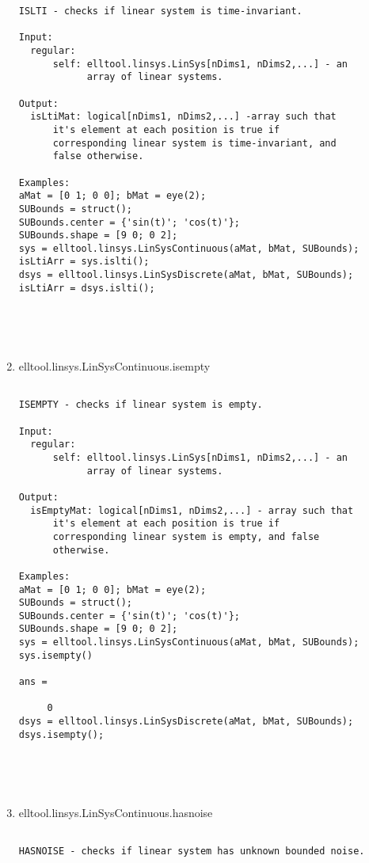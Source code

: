 \begin{enumerate}
\begin{lstlisting}
ISLTI - checks if linear system is time-invariant.

Input:
  regular:
      self: elltool.linsys.LinSys[nDims1, nDims2,...] - an
            array of linear systems.

Output:
  isLtiMat: logical[nDims1, nDims2,...] -array such that
      it's element at each position is true if
      corresponding linear system is time-invariant, and
      false otherwise.

Examples:
aMat = [0 1; 0 0]; bMat = eye(2);
SUBounds = struct();
SUBounds.center = {'sin(t)'; 'cos(t)'};
SUBounds.shape = [9 0; 0 2];
sys = elltool.linsys.LinSysContinuous(aMat, bMat, SUBounds);
isLtiArr = sys.islti();
dsys = elltool.linsys.LinSysDiscrete(aMat, bMat, SUBounds);
isLtiArr = dsys.islti();





\end{lstlisting}
\fontfamily{\familydefault}
\selectfont
\item {elltool.linsys.LinSysContinuous.isempty}
\selectfont
\begin{lstlisting}

ISEMPTY - checks if linear system is empty.

Input:
  regular:
      self: elltool.linsys.LinSys[nDims1, nDims2,...] - an
            array of linear systems.

Output:
  isEmptyMat: logical[nDims1, nDims2,...] - array such that
      it's element at each position is true if
      corresponding linear system is empty, and false
      otherwise.

Examples:
aMat = [0 1; 0 0]; bMat = eye(2);
SUBounds = struct();
SUBounds.center = {'sin(t)'; 'cos(t)'};
SUBounds.shape = [9 0; 0 2];
sys = elltool.linsys.LinSysContinuous(aMat, bMat, SUBounds);
sys.isempty()

ans =

     0
dsys = elltool.linsys.LinSysDiscrete(aMat, bMat, SUBounds);
dsys.isempty();





\end{lstlisting}
\fontfamily{\familydefault}
\selectfont
\item {elltool.linsys.LinSysContinuous.hasnoise}
\selectfont
\begin{lstlisting}

HASNOISE - checks if linear system has unknown bounded noise.


\end{lstlisting}
\end{enumerate}
